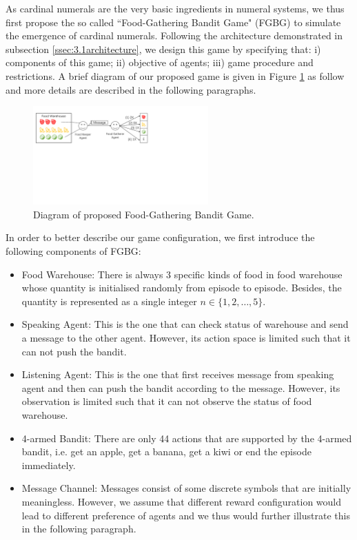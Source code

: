 \documentclass[a4paper,11pt]{article}
\begin{document}
As cardinal numerals are the very basic ingredients in numeral systems, we thus first propose the so called ``Food-Gathering Bandit Game" (FGBG) to simulate the emergence of cardinal numerals. Following the architecture demonstrated in subsection \ref{ssec:3.1architecture}, we design this game by specifying that: i) components of this game; ii) objective of agents; iii) game procedure and restrictions. A brief diagram of our proposed game is given in Figure \ref{fig:game1} as follow and more details are described in the following paragraphs.

\begin{figure}[!h]
  \centering
  \includegraphics[width=0.6\textwidth]{Diagram.pdf}
  \caption{Diagram of proposed Food-Gathering Bandit Game.}\label{fig:game1}
\end{figure}

In order to better describe our game configuration, we first introduce the following components of FGBG:

\begin{itemize}
  \item Food Warehouse: There is always 3 specific kinds of food in food warehouse whose quantity is initialised randomly from episode to episode. Besides, the quantity is represented as a single integer $n\in \{1, 2, \dots, 5\}$.
  \item Speaking Agent: This is the one that can check status of warehouse and send a message to the other agent. However, its action space is limited such that it can not push the bandit.
  \item Listening Agent: This is the one that first receives message from speaking agent and then can push the bandit according to the message. However, its observation is limited such that it can not observe the status of food warehouse.
  \item 4-armed Bandit: There are only 44 actions that are supported by the 4-armed bandit, i.e. get an apple, get a banana, get a kiwi or end the episode immediately.
  \item Message Channel: Messages consist of some discrete symbols that are initially meaningless. However, we assume that different reward configuration would lead to different preference of agents and we thus would further illustrate this in the following paragraph.
\end{itemize}
\end{document}

